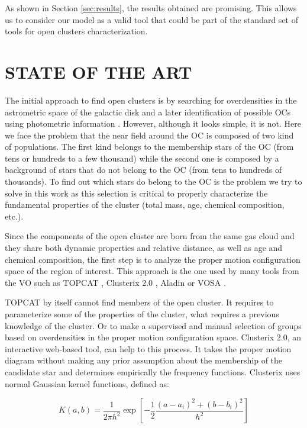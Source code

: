 \documentclass[11pt,a4paper,english,twocolumn]{article}
\begin{document}
As shown in Section \ref{sec:results}, the results obtained are promising.
This allows us to consider our model as a valid tool that could be part
of the standard set of tools for open clusters characterization.

\section{STATE OF THE ART}

The initial approach to find open clusters is by searching for overdensities
in the astrometric space of the galactic disk and a later identification of
possible OCs using photometric information \cite{castro2020hunting}.
However, although it looks simple, it is not. Here we face the problem that the
near field around the OC is composed of two kind of populations.
The first kind belongs to the membership stars of the OC (from tens or hundreds
to a few thousand) while the second one is composed by a background of stars
that do not belong to the OC (from tens to hundreds of thousands).
To find out which stars do belong to the OC is the problem we try to solve in
this work as this selection is critical to properly characterize the
fundamental properties of the cluster (total mass, age, chemical composition, etc.).

Since the components of the open cluster are born from the same gas cloud and they
share both dynamic properties and relative distance, as well as age and chemical
composition, the first step is to analyze the proper motion configuration space of
the region of interest. This approach is the one used by many tools from the VO
such as TOPCAT \cite{taylor2005topcat}, Clusterix 2.0 \cite{balaguer2020clusterix},
Aladin \cite{bonnarel2000aladin} or VOSA \cite{bayo2008vosa}.

TOPCAT by itself cannot find members of the open cluster. It requires to parameterize
some of the properties of the cluster, what requires a previous knowledge of the cluster.
Or to make a supervised and manual selection of groups based on overdensities
in the proper motion configuration space. Clusterix 2.0, an interactive web-based tool,
can help to this process. It takes the proper motion diagram without making any prior
assumption about the membership of the candidate star and determines empirically
the frequency functions. Clusterix uses normal Gaussian kernel functions, defined as:

\begin{equation*}
  K(a, b) = \frac{1}{2 \pi h^{2}} \exp{ \left[ - \frac{1}{2}\frac{\left( a - a_{i} \right)^{2} + \left( b - b_{i} \right)^{2}}{ h^{2}} \right]}
\end{equation*}
\end{document}
